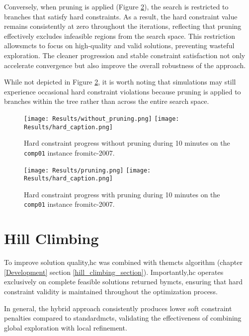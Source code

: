 Conversely, when pruning is applied (Figure \ref{fig:pruning_result}), the search is restricted to branches that satisfy hard constraints. As a result, the hard constraint value remains consistently at zero throughout the iterations, reflecting that pruning effectively excludes infeasible regions from the search space. This restriction allows\ac{mcts} to focus on high-quality and valid solutions, preventing wasteful exploration. The cleaner progression and stable constraint satisfaction not only accelerate convergence but also improve the overall robustness of the approach. 

While not depicted in Figure \ref{fig:pruning_result}, it is worth noting that simulations may still experience occasional hard constraint violations because pruning is applied to branches within the tree rather than across the entire search space.

\begin{figure}
 \centering
     \texttt{[image: Results/without\_pruning.png]}
     \texttt{[image: Results/hard\_caption.png]}
     \caption{Hard constraint progress without pruning during 10 minutes on the \texttt{comp01} instance from\ac{itc-2007}.}
     \label{fig:without_pruning_result}
\end{figure}

\begin{figure}
 \centering
    \texttt{[image: Results/pruning.png]}
    \texttt{[image: Results/hard\_caption.png]}
    \caption{Hard constraint progress with pruning during 10 minutes on the \texttt{comp01} instance from\ac{itc-2007}.}
    \label{fig:pruning_result}
\end{figure}

\section{Hill Climbing}

To improve solution quality,\ac{hc} was combined with the\ac{mcts} algorithm (chapter \ref{Development} section \ref{hill_climbing_section}). Importantly,\ac{hc} operates exclusively on complete feasible solutions returned by\ac{mcts}, ensuring that hard constraint validity is maintained throughout the optimization process.

In general, the hybrid approach consistently produces lower soft constraint penalties compared to standard\ac{mcts}, validating the effectiveness of combining global exploration with local refinement. 

